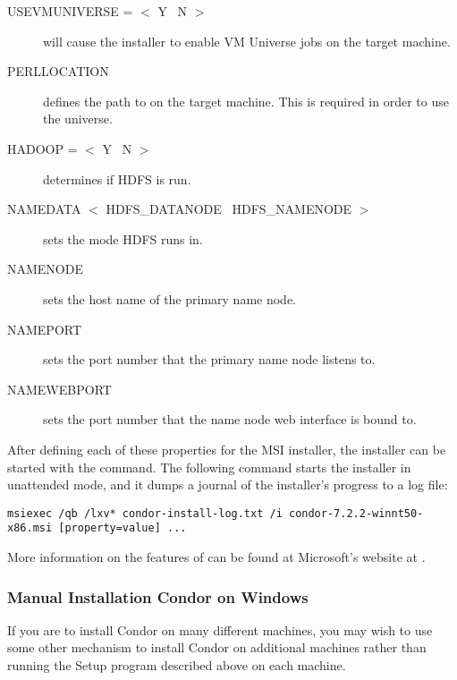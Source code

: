 \begin{description}
\item [USEVMUNIVERSE = $<$ Y \Bar\ N $>$]
will cause the installer to enable VM Universe jobs on the target machine.


\item[PERLLOCATION]
defines the path to  on the target machine. This is required in
order to use the  universe.

\item[HADOOP = $<$ Y \Bar\ N $>$]
determines if HDFS is run.

\item[NAMEDATA $<$ HDFS\_DATANODE \Bar\ HDFS\_NAMENODE $>$]
sets the mode HDFS runs in.

\item[NAMENODE]
sets the host name of the primary name node.

\item[NAMEPORT]
sets the port number that the primary name node listens to.

\item [NAMEWEBPORT]
sets the port number that the name node web interface is bound to.
\end {description}

After defining each of these properties for the MSI installer, the
installer can be started with the  command. The following
command starts the installer in unattended mode, and it dumps a journal of
the installer's progress to a log file:
\footnotesize
\begin{verbatim}
msiexec /qb /lxv* condor-install-log.txt /i condor-7.2.2-winnt50-x86.msi [property=value] ... 
\end{verbatim}
\normalsize

More information on the features of 
can be found at Microsoft's website at
.

\subsubsection{\label{sec:NT-Manual-Install}Manual Installation Condor on Windows}

If you are to install Condor on many different machines, you may wish
to use some other mechanism to install Condor on additional machines
rather than running the Setup program described above on each machine.

